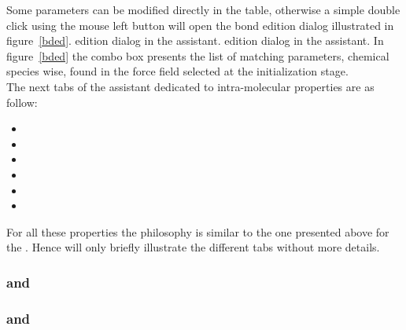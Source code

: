 Some parameters can be modified directly in the table, 
otherwise a simple double click using the mouse left button will open the bond edition dialog illustrated in figure~\ref{bded}. 
{ edition dialog in the  assistant.}{ edition dialog in the  assistant.}
\clearpage
\noindent In figure~\ref{bded} the  combo box presents the list of matching parameters, chemical species wise, 
found in the force field selected at the initialization stage. \\[0.5cm]
The next tabs of the assistant dedicated to intra-molecular properties are as follow:
\begin{itemize}
\item {}
\item {}
\item {}
\item {}
\item {}
\item {}
\end{itemize}
For all these properties the philosophy is similar to the one presented above for the . 
Hence will only briefly illustrate the different tabs without more details. 

\subsubsection*{ and }

\newpage

\subsubsection*{ and }

\vspace{-0.5cm}

\subsubsection*{}

